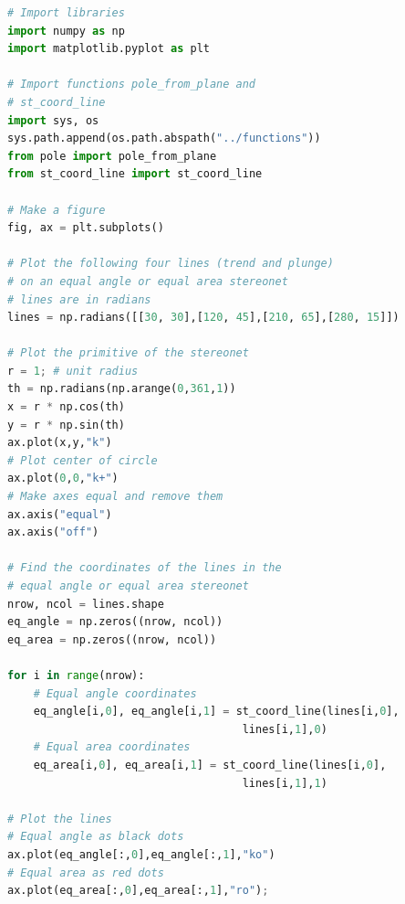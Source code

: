 \documentclass[a4paper , 12pt]{book}
\begin{document}
\begin{center}
\begin{lstlisting}[language=Python, frame=single]
# Import libraries
import numpy as np
import matplotlib.pyplot as plt

# Import functions pole_from_plane and
# st_coord_line
import sys, os
sys.path.append(os.path.abspath("../functions"))
from pole import pole_from_plane
from st_coord_line import st_coord_line

# Make a figure
fig, ax = plt.subplots()

# Plot the following four lines (trend and plunge)
# on an equal angle or equal area stereonet
# lines are in radians
lines = np.radians([[30, 30],[120, 45],[210, 65],[280, 15]])

# Plot the primitive of the stereonet
r = 1; # unit radius
th = np.radians(np.arange(0,361,1))
x = r * np.cos(th)
y = r * np.sin(th)
ax.plot(x,y,"k")
# Plot center of circle
ax.plot(0,0,"k+")
# Make axes equal and remove them
ax.axis("equal")
ax.axis("off")

# Find the coordinates of the lines in the
# equal angle or equal area stereonet
nrow, ncol = lines.shape
eq_angle = np.zeros((nrow, ncol))
eq_area = np.zeros((nrow, ncol))

for i in range(nrow):
    # Equal angle coordinates
    eq_angle[i,0], eq_angle[i,1] = st_coord_line(lines[i,0],
                                    lines[i,1],0) 
    # Equal area coordinates
    eq_area[i,0], eq_area[i,1] = st_coord_line(lines[i,0],
                                    lines[i,1],1)
    
# Plot the lines
# Equal angle as black dots
ax.plot(eq_angle[:,0],eq_angle[:,1],"ko")
# Equal area as red dots
ax.plot(eq_area[:,0],eq_area[:,1],"ro");
\end{lstlisting}
\end{center}
\end{document}
